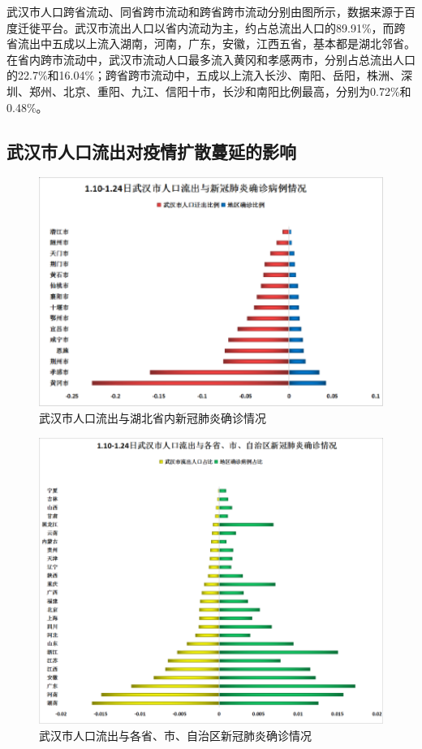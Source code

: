\documentclass[12pt,hyperref,]{ctexart}
\begin{document}
武汉市人口跨省流动、同省跨市流动和跨省跨市流动分别由图所示，数据来源于百度迁徙平台。武汉市流出人口以省内流动为主，约占总流出人口的89.91\%，而跨省流出中五成以上流入湖南，河南，广东，安徽，江西五省，基本都是湖北邻省。在省内跨市流动中，武汉市流动人口最多流入黄冈和孝感两市，分别占总流出人口的22.7\%和16.04\%；跨省跨市流动中，五成以上流入长沙、南阳、岳阳，株洲、深圳、郑州、北京、重阳、九江、信阳十市，长沙和南阳比例最高，分别为0.72\%和0.48\%。

\hypertarget{ux6b66ux6c49ux5e02ux4ebaux53e3ux6d41ux51faux5bf9ux75abux60c5ux6269ux6563ux8513ux5ef6ux7684ux5f71ux54cd}{%
\subsection{武汉市人口流出对疫情扩散蔓延的影响}\label{ux6b66ux6c49ux5e02ux4ebaux53e3ux6d41ux51faux5bf9ux75abux60c5ux6269ux6563ux8513ux5ef6ux7684ux5f71ux54cd}}

\begin{figure}
\includegraphics[width=5.56in]{image/3.3.1} \caption{武汉市人口流出与湖北省内新冠肺炎确诊情况}\label{fig:3.7}
\end{figure}

\begin{figure}
\includegraphics[width=5.56in]{image/3.3.2} \caption{武汉市人口流出与各省、市、自治区新冠肺炎确诊情况}\label{fig:3.8}
\end{figure}
\end{document}
